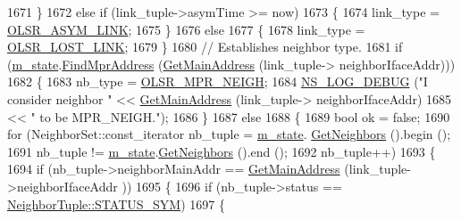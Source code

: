 \begin{DoxyCode}
1671         \}
1672       \textcolor{keywordflow}{else} \textcolor{keywordflow}{if} (link\_tuple->asymTime >= now)
1673         \{
1674           link\_type = \hyperlink{olsr-routing-protocol_8cc_a8ebf1daea9834b2e4dfb42ca05b05f4a}{OLSR\_ASYM\_LINK};
1675         \}
1676       \textcolor{keywordflow}{else}
1677         \{
1678           link\_type = \hyperlink{olsr-routing-protocol_8cc_ab230470cf0b3270a8bba72a05501dd8d}{OLSR\_LOST\_LINK};
1679         \}
1680       \textcolor{comment}{// Establishes neighbor type.}
1681       \textcolor{keywordflow}{if} (\hyperlink{classns3_1_1olsr_1_1RoutingProtocol_a07942ec1a7df71b609c8d2ff3b567c49}{m\_state}.\hyperlink{classns3_1_1olsr_1_1OlsrState_aa73e8ae0cc7d2d68b148cc5937259d03}{FindMprAddress} (\hyperlink{classns3_1_1olsr_1_1RoutingProtocol_ae01451170fb389d322b33ed6d954f460}{GetMainAddress} (link\_tuple->
      neighborIfaceAddr)))
1682         \{
1683           nb\_type = \hyperlink{olsr-routing-protocol_8cc_a08fbe0b4c74b944f681630df4fa0fd82}{OLSR\_MPR\_NEIGH};
1684           \hyperlink{group__logging_ga413f1886406d49f59a6a0a89b77b4d0a}{NS\_LOG\_DEBUG} (\textcolor{stringliteral}{"I consider neighbor "} << \hyperlink{classns3_1_1olsr_1_1RoutingProtocol_ae01451170fb389d322b33ed6d954f460}{GetMainAddress} (link\_tuple->
      neighborIfaceAddr)
1685                                                << \textcolor{stringliteral}{" to be MPR\_NEIGH."});
1686         \}
1687       \textcolor{keywordflow}{else}
1688         \{
1689           \textcolor{keywordtype}{bool} ok = \textcolor{keyword}{false};
1690           \textcolor{keywordflow}{for} (NeighborSet::const\_iterator nb\_tuple = \hyperlink{classns3_1_1olsr_1_1RoutingProtocol_a07942ec1a7df71b609c8d2ff3b567c49}{m\_state}.
      \hyperlink{classns3_1_1olsr_1_1OlsrState_a82d5882ca3fdb93a9c1110c6f176c03c}{GetNeighbors} ().begin ();
1691                nb\_tuple != \hyperlink{classns3_1_1olsr_1_1RoutingProtocol_a07942ec1a7df71b609c8d2ff3b567c49}{m\_state}.\hyperlink{classns3_1_1olsr_1_1OlsrState_a82d5882ca3fdb93a9c1110c6f176c03c}{GetNeighbors} ().end ();
1692                nb\_tuple++)
1693             \{
1694               \textcolor{keywordflow}{if} (nb\_tuple->neighborMainAddr == \hyperlink{classns3_1_1olsr_1_1RoutingProtocol_ae01451170fb389d322b33ed6d954f460}{GetMainAddress} (link\_tuple->neighborIfaceAddr
      ))
1695                 \{
1696                   \textcolor{keywordflow}{if} (nb\_tuple->status == \hyperlink{structns3_1_1olsr_1_1NeighborTuple_ad4b623edaedb3a5244291c738ce87e12a1649b9e4d61ac6e27eff65e8bd5dfe15}{NeighborTuple::STATUS\_SYM})
1697                     \{

\end{DoxyCode}
